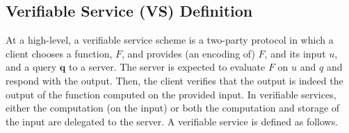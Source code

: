 
\subsection{Verifiable Service (VS) Definition}\label{subsec:VS}
At a high-level, a verifiable service scheme is a two-party protocol in which a client chooses a function, $F$, and provides (an encoding of) $F$, and its input $u$, and a query $\bm{q}$ to a server.  The server is expected to evaluate $F$ on $u$ and $q$ and respond with the output. Then, the client  verifies that the output is indeed the output of the function computed on the provided input. In verifiable services, either the computation (on the input) or both the computation and storage of the input are delegated to the server. A verifiable service is defined as follows. 


